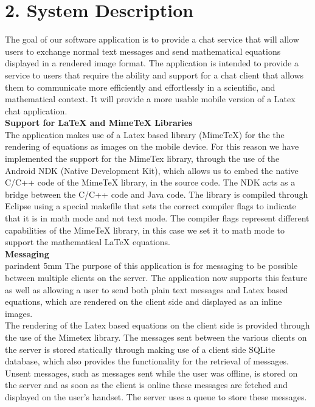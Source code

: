 \documentclass[29pt,a4paper]{moderncv}
\begin{document}
\newpage
\section*{\textbf{2. System Description}}
	\vspace{4mm}
		 The goal of our software application is to provide a chat service that will allow users to exchange normal text messages and send mathematical equations displayed in a rendered image format.  The application is intended to provide a service to users that require the ability and support for a chat client that allows them to communicate more efficiently and effortlessly in a scientific, and mathematical context. It will provide a more usable mobile version of a Latex chat application.\\ 
		
		\noindent\textbf{Support for LaTeX and MimeTeX Libraries} \\
		\parindent 5mm The application makes use of a Latex based library (MimeTeX) for the the rendering of equations as images on the mobile device.  For this reason we have implemented the support for the MimeTex library, through the use of the Android NDK (Native Development Kit), which allows us to embed the native C/C++ code of the MimeTeX library, in the source code. 
		\parindent 5mm The NDK acts as a bridge between the C/C++ code and Java code. The library is compiled through Eclipse using a special makefile that sets the correct compiler flags to indicate that it is in math mode and not text mode. The compiler flags represent different capabilities of the MimeTeX library, in this case we set it to math mode to support the mathematical LaTeX equations.\\
		
		
		\noindent\textbf{Messaging}
		\\parindent 5mm The purpose of this application is for messaging to be possible between multiple clients on the server. The application now supports this feature as well as allowing a user to send both plain text messages and Latex based equations, which are rendered on the client side and displayed as an inline images.\\
		The rendering of the Latex based equations on the client side is provided through the use of the Mimetex library. The messages sent between the various clients on the server is stored statically through making use of a client side SQLite database, which also provides the functionality for the retrieval of messages.
		\\Unsent messages, such as messages sent while the user was offline, is stored on the server and as soon as the client is online these messages are fetched and displayed on the user's handset. The server uses a queue to store these messages.\\
		
\end{document}
